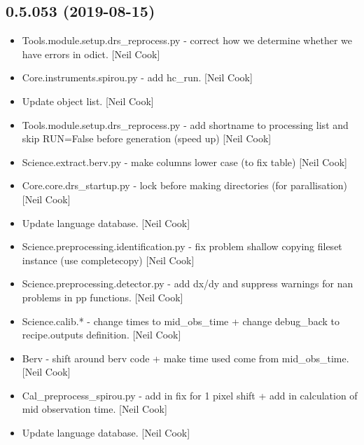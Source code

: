 \documentclass[a4paper,10pt,english]{report}
\begin{document}
\subsection{0.5.053 (2019-08-15)}
\label{\detokenize{misc/changelog:id88}}\begin{itemize}
\item {} 
Tools.module.setup.drs\_reprocess.py - correct how we determine whether
we have errors in odict. {[}Neil Cook{]}

\item {} 
Core.instruments.spirou.py - add hc\_run. {[}Neil Cook{]}

\item {} 
Update object list. {[}Neil Cook{]}

\item {} 
Tools.module.setup.drs\_reprocess.py - add shortname to processing list
and skip RUN=False before generation (speed up) {[}Neil Cook{]}

\item {} 
Science.extract.berv.py - make columns lower case (to fix table) {[}Neil
Cook{]}

\item {} 
Core.core.drs\_startup.py - lock before making directories (for
parallisation) {[}Neil Cook{]}

\item {} 
Update language database. {[}Neil Cook{]}

\item {} 
Science.preprocessing.identification.py - fix problem shallow copying
fileset instance (use completecopy) {[}Neil Cook{]}

\item {} 
Science.preprocessing.detector.py - add dx/dy and suppress warnings
for nan problems in pp functions. {[}Neil Cook{]}

\item {} 
Science.calib.* - change times to mid\_obs\_time + change debug\_back to
recipe.outputs definition. {[}Neil Cook{]}

\item {} 
Berv - shift around berv code + make time used come from mid\_obs\_time.
{[}Neil Cook{]}

\item {} 
Cal\_preprocess\_spirou.py - add in fix for 1 pixel shift + add in
calculation of mid observation time. {[}Neil Cook{]}

\item {} 
Update language database. {[}Neil Cook{]}


\end{itemize}
\end{document}
